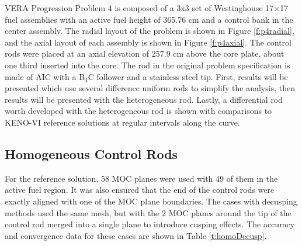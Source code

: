 VERA Progression Problem 4 is composed of a 3x3 set of Westinghouse 17$\times$17 fuel assemblies with an active fuel height of 365.76 cm and a control bank in the center assembly.  The radial layout of the problem is shown in Figure \ref{f:p4radial}, and the axial layout of each assembly is shown in Figure \ref{f:p4axial}.  The control rods were placed at an axial elevation of 257.9 cm above the core plate, about one third inserted into the core.  The rod in the original problem specification is made of AIC with a B$_4$C follower and a stainless steel tip.  First, results will be presented which use several difference uniform rods to simplify the analysis, then results will be presented with the heterogeneous rod.  Lastly, a differential rod worth developed with the heterogeneous rod is shown with comparisons to KENO-VI reference solutions at regular intervals along the curve.

\subsection{Homogeneous Control Rods}

For the reference solution, 58 MOC planes were used with 49 of them in the active fuel region.  It was also ensured that the end of the control rods were exactly aligned with one of the MOC plane boundaries.  The cases with decusping methods used the same mesh, but with the 2 MOC planes around the tip of the control rod merged into a single plane to introduce cusping effects.  The accuracy and convergence data for these cases are shown in Table \ref{t:homoDecusp}.

